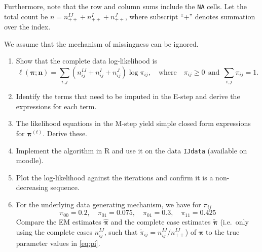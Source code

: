 \documentclass{article}
\begin{document}
Furthermore, note that the row and column sums include the \texttt{NA}
cells. Let the total count be $n = n^{IJ}_{++} + n^I_{++} + n^J_{++}$, where
subscript ``+'' denotes summation over the index.

We assume that the mechanism of missingness can be ignored.

\begin{enumerate}
\item Show that the complete data log-likelihood is
  \begin{displaymath}
    \ell(\bm\pi;\bm{n}) = \sum_{i,j} (n^{IJ}_{ij}+n^I_{ij}+n^J_{ij})\log \pi_{ij},
    \quad\text{where}\quad
    \pi_{ij}\ge0 ~~\text{and}~~ \sum_{i,j}\pi_{ij} = 1.
  \end{displaymath}
\item Identify the terms that need to be imputed in the E-step and
  derive the expressions for each term.
\item The likelihood equations in the M-step yield simple closed form
  expressions for $\bm\pi^{(t)}$. Derive these.
\item Implement the algorithm in {R} and use it on the data
  \texttt{IJdata} (available on moodle).
\item Plot the log-likelihood against the iterations and confirm it is
  a non-decreasing sequence.
\item For the underlying data generating mechanism, we have for $\pi_{ij}$
  \begin{equation}
    \pi_{00} = 0.2, \quad \pi_{01} = 0.075,\quad \pi_{01} = 0.3,\quad \pi_{11} = 0.425
    \label{eq:pi}
  \end{equation}
  Compare the EM estimates $\hat{\bm\pi}$ and the complete case
  estimates $\tilde{\bm{\pi}}$ (i.e.\ only using the complete cases
  $n_{ij}^{IJ}$, such that $\tilde{\pi}_{ij} =
  n^{IJ}_{ij}/n_{++}^{IJ}$) of $\bm\pi$ to the true parameter values
  in \eqref{eq:pi}.
\end{enumerate}
\end{document}
